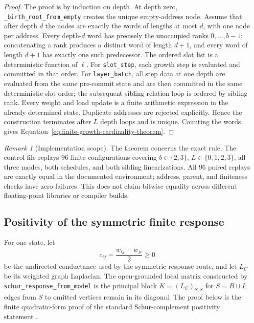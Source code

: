 \documentclass[11pt]{article}
\theoremstyle{remark}
\newtheorem{remark}[definition]{Remark}
\newcommand{\code}[1]{\texttt{#1}}
\numberwithin{equation}{section}
\begin{document}
\begin{proof}
The proof is by induction on depth. At depth zero, \code{\_birth\_root\_from\_empty} creates the unique empty-address node. Assume that after depth \(d\) the nodes are exactly the words of lengths at most \(d\), with one node per address. Every depth-\(d\) word has precisely the unoccupied ranks \(0,\ldots,b-1\); concatenating a rank produces a distinct word of length \(d+1\), and every word of length \(d+1\) has exactly one such predecessor. The ordered slot list is a deterministic function of \(\ell\). For \code{slot\_step}, each growth step is evaluated and committed in that order. For \code{layer\_batch}, all step data at one depth are evaluated from the same pre-commit state and are then committed in the same deterministic slot order; the subsequent sibling relation loop is ordered by sibling rank. Every weight and load update is a finite arithmetic expression in the already determined state. Duplicate addresses are rejected explicitly. Hence the construction terminates after \(L\) depth loops and is unique. Counting the words gives Equation~\eqref{eq:finite-growth-cardinality-theorem}.
\end{proof}

\begin{remark}[Implementation scope]
The theorem concerns the exact rule. The control file replays 96 finite configurations covering \(b\in\{2,3\}\), \(L\in\{0,1,2,3\}\), all three modes, both schedules, and both sibling linearizations. All 96 paired replays are exactly equal in the documented environment; address, parent, and finiteness checks have zero failures. This does not claim bitwise equality across different floating-point libraries or compiler builds.
\end{remark}

\subsection{Positivity of the symmetric finite response}
For one state, let
\[
 c_{ij}=\frac{w_{ij}+w_{ji}}{2}\ge0
\]
be the undirected conductance used by the symmetric response route, and let \(L_C\) be its weighted graph Laplacian. The open-grounded local matrix constructed by \code{schur\_response\_from\_model} is the principal block \(K=(L_C)_{S,S}\) for \(S=B\sqcup I\); edges from \(S\) to omitted vertices remain in its diagonal. The proof below is the finite quadratic-form proof of the standard Schur-complement positivity statement \cite{HornJohnson2013,Zhang2005}.
\end{document}
